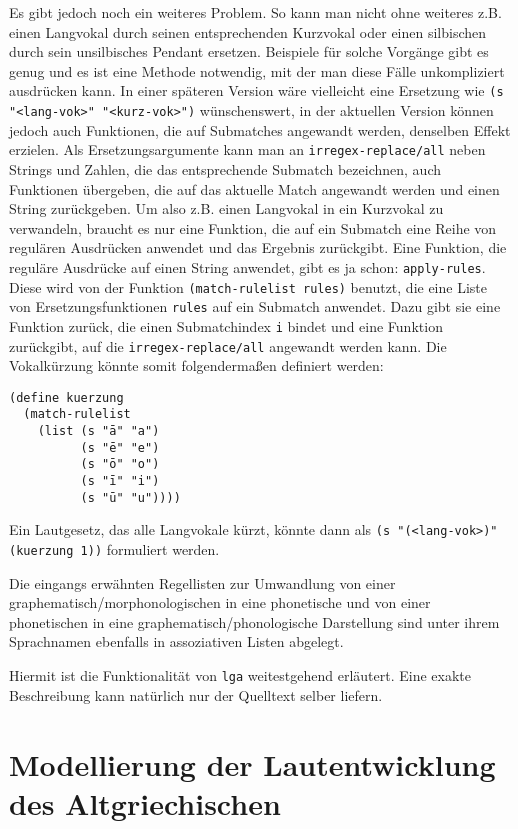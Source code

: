 \documentclass[12pt,a4paper,normalheadings]{scrartcl}
\def\tt#1{\texttt{#1}}
\begin{document}
Es gibt jedoch noch ein weiteres Problem.
So kann man nicht ohne weiteres z.B. einen Langvokal durch seinen
entsprechenden Kurzvokal oder einen silbischen durch sein unsilbisches
Pendant ersetzen.
Beispiele für solche Vorgänge gibt es genug und es ist eine Methode notwendig,
mit der man diese Fälle unkompliziert ausdrücken kann.
In einer späteren Version wäre vielleicht eine Ersetzung wie
\tt{(s "<lang-vok>" "<kurz-vok>")} wünschenswert,
in der aktuellen Version können jedoch auch Funktionen,
die auf Submatches angewandt werden, denselben Effekt erzielen.
Als Ersetzungsargumente kann man an \tt{irregex-replace/all}
neben Strings und Zahlen, die das entsprechende Submatch bezeichnen,
auch Funktionen übergeben,
die auf das aktuelle Match angewandt werden und einen String zurückgeben.
Um also z.B. einen Langvokal in ein Kurzvokal zu verwandeln,
braucht es nur eine Funktion,
die auf ein Submatch eine Reihe von regulären Ausdrücken anwendet
und das Ergebnis zurückgibt.
Eine Funktion, die reguläre Ausdrücke auf einen String anwendet,
gibt es ja schon: \tt{apply-rules}.
Diese wird von der Funktion \tt{(match-rulelist rules)} benutzt,
die eine Liste von Ersetzungsfunktionen \tt{rules}
auf ein Submatch anwendet.
Dazu gibt sie eine Funktion zurück,
die einen Submatchindex \tt{i} bindet und eine Funktion zurückgibt,
auf die \tt{irregex-replace/all} angewandt werden kann.
Die Vokalkürzung könnte somit folgendermaßen definiert werden:
\begin{verbatim}
(define kuerzung
  (match-rulelist
    (list (s "ā" "a")
          (s "ē" "e")
          (s "ō" "o")
          (s "ī" "i")
          (s "ū" "u"))))
\end{verbatim}
Ein Lautgesetz, das alle Langvokale kürzt,
könnte dann als \tt{(s "(<lang-vok>)" (kuerzung 1))} formuliert werden.

Die eingangs erwähnten Regellisten zur Umwandlung von einer
graphematisch/morphonologischen in eine phonetische und von
einer phonetischen in eine graphematisch/phonologische Darstellung
sind unter ihrem Sprachnamen ebenfalls in
assoziativen Listen abgelegt.

Hiermit ist die Funktionalität von \tt{lga} weitestgehend erläutert.
Eine exakte Beschreibung kann natürlich nur der Quelltext selber liefern.

\section{Modellierung der Lautentwicklung des Altgriechischen}
\end{document}
